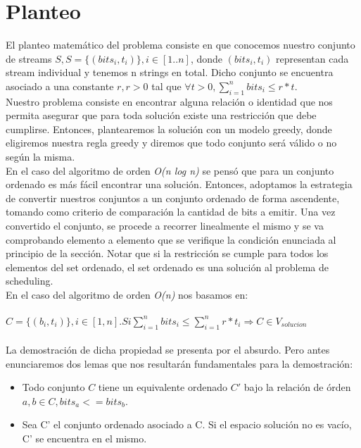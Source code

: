 \documentclass[12pt]{article}
\begin{document}
\section{Planteo}\label{planteo}
El planteo matem\'atico del problema consiste en que conocemos nuestro conjunto de streams $S, S = \{(bits_i,t_i)\} , i \in [1..n]$, donde $(bits_i,t_i)$ representan cada stream individual y tenemos n strings en total.
Dicho conjunto se encuentra asociado a una constante $r, r > 0$ tal que $\forall t > 0,  \sum\limits_{i=1}^n bits_i \leq r * t $.\\
Nuestro problema consiste en encontrar alguna relaci\'on o identidad que nos permita asegurar que para toda soluci\'on 
existe una restricci\'on que debe cumplirse. Entonces, plantearemos la soluci\'on con un modelo greedy, donde eligiremos
nuestra regla greedy y diremos que todo conjunto ser\'a v\'alido o no seg\'un la misma.\\
En el caso del algoritmo de orden \emph{O(n log n)} se pens\'o que para un conjunto ordenado es m\'as f\'acil encontrar una soluci\'on. Entonces, adoptamos la estrategia de convertir nuestros conjuntos a un conjunto ordenado de forma
ascendente, tomando como criterio de comparaci\'on la cantidad de bits a emitir. Una vez convertido el conjunto, se
procede a recorrer linealmente el mismo y se va comprobando elemento a elemento que se verifique la condici\'on enunciada al principio de la secci\'on. Notar que si la restricci\'on se cumple para todos los elementos del set ordenado, el set ordenado es una soluci\'on al problema de scheduling.\\
En el caso del algoritmo de orden \emph{O(n)} nos basamos en:\\
\\\begin {math} C = \{(b_i, t_i)\}, i \in [1, n]. Si  \sum\limits_{i=1}^n bits_i \leq \sum\limits_{i=1}^n r * t_i \Rightarrow C \in V_{solucion} \end{math}\\
\\
La demostraci\'on de dicha propiedad se presenta por el absurdo. Pero antes enunciaremos dos lemas que nos resultar\'an fundamentales para la demostraci\'on:
\begin{itemize}
	\item Todo conjunto $C$ tiene un equivalente ordenado $C'$ bajo la relaci\'on de \'orden $a,b \in C, bits_a <= bits_b$.
	\item Sea C' el conjunto ordenado asociado a C. Si el espacio soluci\'on no es vac\'io, C' se encuentra en el mismo.
\end{itemize}
\end{document}
